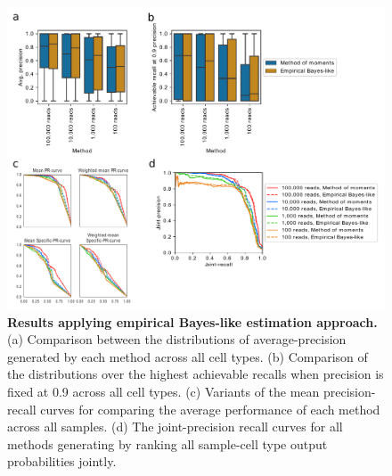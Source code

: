  \begin{figure}[htbp]
    \centerline{\includegraphics[width=13cm]{figures/empirical_bayes_results.pdf}}
    \caption{\textbf{Results applying empirical Bayes-like estimation approach.}  (a) Comparison between the distributions of average-precision generated by each method across all cell types.  (b) Comparison of the distributions over the highest achievable recalls when precision is fixed at 0.9 across all cell types. (c) Variants of the mean precision-recall curves for comparing the average performance of each method across all samples. (d) The joint-precision recall curves for all methods generating by ranking all sample-cell type output probabilities jointly.}
        \label{fig:shrinkage}
      \end{figure}
 